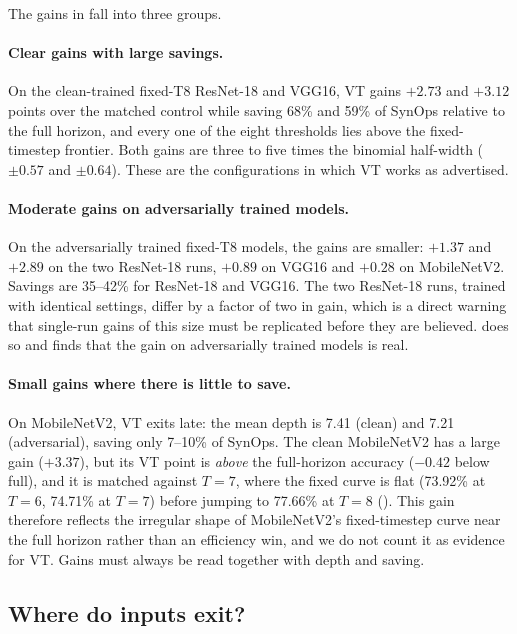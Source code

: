 The gains in  fall into three groups.

\paragraph{Clear gains with large savings.} On the clean-trained fixed-T8 ResNet-18 and VGG16, VT gains $+2.73$ and $+3.12$ points over the matched control while saving 68\% and 59\% of SynOps relative to the full horizon, and every one of the eight thresholds lies above the fixed-timestep frontier. Both gains are three to five times the binomial half-width ($\pm 0.57$ and $\pm 0.64$). These are the configurations in which VT works as advertised.

\paragraph{Moderate gains on adversarially trained models.} On the adversarially trained fixed-T8 models, the gains are smaller: $+1.37$ and $+2.89$ on the two ResNet-18 runs, $+0.89$ on VGG16 and $+0.28$ on MobileNetV2. Savings are 35--42\% for ResNet-18 and VGG16. The two ResNet-18 runs, trained with identical settings, differ by a factor of two in gain, which is a direct warning that single-run gains of this size must be replicated before they are believed.  does so and finds that the gain on adversarially trained models is real.

\paragraph{Small gains where there is little to save.} On MobileNetV2, VT exits late: the mean depth is 7.41 (clean) and 7.21 (adversarial), saving only 7--10\% of SynOps. The clean MobileNetV2 has a large gain ($+3.37$), but its VT point is \emph{above} the full-horizon accuracy ($-0.42$ below full), and it is matched against $T = 7$, where the fixed curve is flat (73.92\% at $T = 6$, 74.71\% at $T = 7$) before jumping to 77.66\% at $T = 8$ (). This gain therefore reflects the irregular shape of MobileNetV2's fixed-timestep curve near the full horizon rather than an efficiency win, and we do not count it as evidence for VT. Gains must always be read together with depth and saving.

\subsection{Where do inputs exit?}

